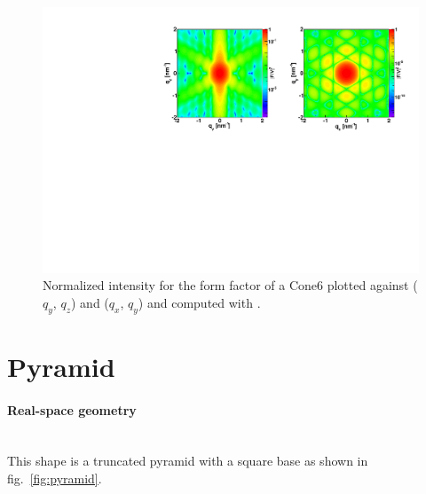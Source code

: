 \begin{figure}[ht]
\begin{center}
\includegraphics[angle=-90,width=\textwidth]{Figures/ff/figffcone6.pdf}
\end{center}
\caption{Normalized intensity for the form factor of a Cone6 plotted against ($q_y$, $q_z$) and ($q_x$, $q_y$) and computed with .}
\label{fig:FFCone6Ex}
\end{figure}


\newpage
\section{Pyramid}

\paragraph{Real-space geometry}\mbox{}\\
This shape is a  truncated pyramid with a square base as shown in fig.~\ref{fig:pyramid}.

